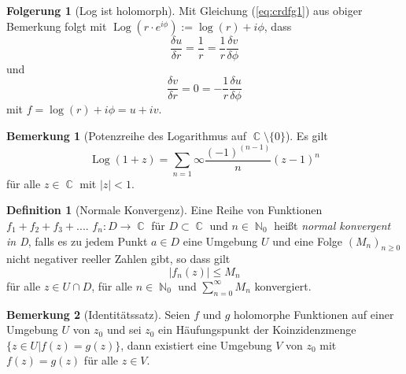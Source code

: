 \documentclass[10pt,a4paper]{article}
\theoremstyle{plain}
\theoremstyle{definition}
\newtheorem{defn}{Definition}[section]
\newtheorem*{note}{Bemerkung}
\newtheorem*{folg}{Folgerung}
\theoremstyle{remark}
\DeclareMathOperator{\C}{\mathbb{C}}
\DeclareMathOperator{\N}{\mathbb{N}}
\DeclareMathOperator{\Log}{Log}
\begin{document}
\begin{folg}[Log ist holomorph]

Mit Gleichung (\ref{eq:crdfg1}) aus obiger Bemerkung folgt mit $\Log(r\cdot e^{i \phi}) := \log(r) + i \phi$, dass $$\frac{\delta u}{\delta r} =\frac{1}{r} = \frac{1}{r} \frac{\delta v}{\delta \phi} $$ und $$\frac{\delta v}{\delta r} = 0=-\frac{1}{r} \frac{\delta u}{\delta \phi}$$ mit $f = \log(r) + i\phi= u +iv$.

\end{folg}

\begin{note}[Potenzreihe des Logarithmus auf $\C\setminus\{0\}$]

Es gilt $$\Log(1+z) = \sum_{n = 1}{\infty}\frac{(-1)^{(n-1)}}{n}(z-1)^{n}$$ für alle $z \in \C$ mit $|z| < 1$.

\end{note}

\begin{defn}[Normale Konvergenz]

Eine Reihe von Funktionen\\ $f_{1}+f_{2}+f_{3}+....$ $f_{n}: D\rightarrow \C $ für $D \subset \C$ und $n \in \N_{0}$ heißt \textit{normal konvergent in D}, falls es zu jedem Punkt $a \in D$ eine Umgebung $U$ und eine Folge $(M_{n})_{n\geq0}$ nicht negativer reeller Zahlen gibt, so dass gilt $$|f_{n}(z)|\leq M_{n}$$ für alle $z \in U \cap D$, für alle $n \in \N_{0}$ und $\sum_{n = 0}^{\infty}M_{n}$ konvergiert.

\end{defn}

\begin{note}[Identitätssatz]

Seien $f$ und $g$ holomorphe Funktionen auf einer Umgebung $U$ von $z_{0}$ und sei $z_{0}$ ein Häufungspunkt der Koinzidenzmenge\\  $\{ z \in U  |  f(z) = g(z) \}$, dann existiert eine Umgebung $V$ von $z_{0}$ mit $f(z) = g(z)$ für alle $z \in V$.

\end{note}
\end{document}
